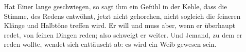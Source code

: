 Hat Einer lange geschwiegen, so sagt ihm ein Gefühl in der Kehle, dass die Stimme, des Redens entwöhnt, jetzt nicht gehorchen, nicht sogleich die feineren Klänge und Halbtöne treffen wird. Er will und muss aber, wenn er überhaupt redet, von feinen Dingen reden; also schweigt er weiter. Und Jemand, zu dem er reden wollte, wendet sich enttäuscht ab: es wird ein Weib gewesen sein.
\par

